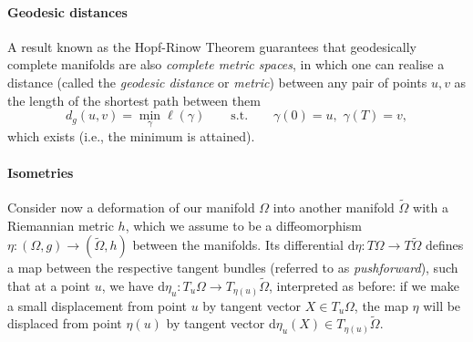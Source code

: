 \paragraph{Geodesic distances}
%
A result known as the Hopf-Rinow Theorem 
%
 guarantees that geodesically complete manifolds are also {\em complete metric spaces}, in which one can realise a distance (called the {\em geodesic distance} or {\em metric})  between any pair of points $u,v$ as the length of the shortest path between them
$$
d_g(u,v) = \min_{\gamma} \ell(\gamma) \quad\quad \text{s.t.} \quad\quad \gamma(0) = u, \,\, \gamma(T) = v,
$$
which exists (i.e., the minimum is attained).












\paragraph{Isometries}
Consider now a deformation of our manifold $\Omega$ into another manifold $\tilde{\Omega}$ with a Riemannian metric $h$, which we assume to be 
%
a diffeomorphism $\eta: (\Omega, g) \rightarrow (\tilde{\Omega}, h)$ between the manifolds.   
%
Its differential $\mathrm{d}\eta : T\Omega \rightarrow T\tilde{\Omega}$ defines a map between the respective tangent bundles (referred to as {\em pushforward}), such that   
at a point $u$, we have $\mathrm{d}\eta_u : T_u \Omega \rightarrow T_{\eta(u)}\tilde{\Omega}$, %
%
interpreted as before: 
if we make a small displacement from point $u$ by tangent vector $X \in T_u \Omega$, the map $\eta$ will be displaced from point $\eta(u)$ by tangent vector $\mathrm{d}\eta_u(X) \in T_{\eta(u)}\tilde{\Omega}$. 


